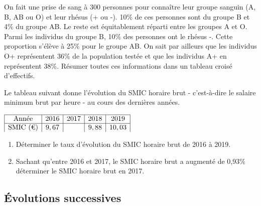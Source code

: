 {\begin{Exercice} %
On fait une prise de sang à 300 personnes pour connaître leur groupe sanguin (A, B, AB ou
O) et leur rhésus (+ ou -). 10\% de ces personnes sont du groupe B et 4\% du groupe AB. Le reste est équitablement réparti entre les groupes A et O. Parmi les individus du groupe B, 10\% des personnes ont le rhésus -. Cette proportion s'élève à 25\% pour le groupe AB. On sait par ailleurs que les individus O+ représentent 36\% de la population testée et que les individus A+ en représentent 38\%.
Résumer toutes ces informations dans un tableau croisé d'effectifs.
\end{Exercice}

\begin{Exercice} %

Le tableau suivant donne l'évolution du SMIC horaire brut - c'est-à-dire le salaire minimum brut par heure - au cours des dernières années.\\
\vspace{-0.5cm}
\begin{center}
 $\renewcommand{\arraystretch}{1}
\begin{array}{|c|c|c|c|c|}
\hline
\text{Année} & 2016 &  2017 &  2018 &  2019\\
\hline
 \text{SMIC (€)} & 9,67 & ~ & 9,88 & 10,03\\

\end{array}
\renewcommand{\arraystretch}{1}$
\end{center}

\begin{enumerate}
\item Déterminer le taux d'évolution du SMIC horaire brut de 2016 à 2019.
\item Sachant qu'entre 2016 et 2017, le SMIC horaire brut a augmenté de 0,93\% déterminer le SMIC horaire brut en 2017.
\end{enumerate}
\end{Exercice}

\newpage

\subsection*{Évolutions successives}

}
